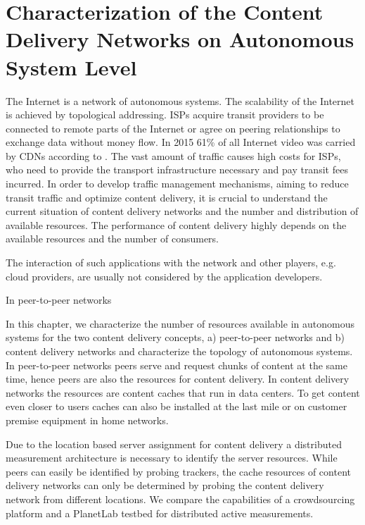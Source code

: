 \chapter{Characterization of the Content Delivery Networks on Autonomous System Level}\label{chap:aslevel}

The Internet is a network of autonomous systems.
The scalability of the Internet is achieved by topological addressing.
ISPs acquire transit providers to be connected to remote parts of the Internet or agree on peering relationships to exchange data without money flow.
In 2015 61\% of all Internet video was carried by CDNs according to \cite{cisco}.
The vast amount of traffic causes high costs for ISPs, who need to provide the transport infrastructure necessary and pay transit fees incurred.
In order to develop traffic management mechanisms, aiming to reduce transit traffic and optimize content delivery, it is crucial to understand the current situation of content delivery networks and the number and distribution of available resources.
The performance of content delivery highly depends on the available resources and the number of consumers.

The interaction of such applications with the network and other players, e.g. cloud providers, are usually not considered by the application developers.

In peer-to-peer networks

In this chapter, we characterize the number of resources available in autonomous systems for the two content delivery concepts, a) peer-to-peer networks and b) content delivery networks and characterize the topology of autonomous systems.
In peer-to-peer networks peers serve and request chunks of content at the same time, hence peers are also the resources for content delivery.
In content delivery networks the resources are content caches that run in data centers. To get content even closer to users caches can also be installed at the last mile or on customer premise equipment in home networks.

Due to the location based server assignment for content delivery a distributed measurement architecture is necessary to identify the server resources.
While peers can easily be identified by probing trackers, the cache resources of content delivery networks can only be determined by probing the content delivery network from different locations.
We compare the capabilities of a crowdsourcing platform and a PlanetLab testbed for distributed active measurements.

